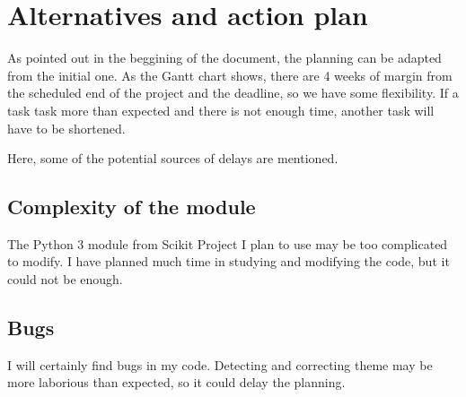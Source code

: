 \documentclass[a4paper]{article}
\begin{document}
    \section{Alternatives and action plan}

    As pointed out in the beggining of the document, the planning can be adapted from the initial one. As the Gantt chart shows, there are 4 weeks of margin from the scheduled end of the project and the deadline, so we have some flexibility. If a task task more than expected and there is not enough time, another task will have to be shortened.

    Here, some of the potential sources of delays are mentioned.

    \subsection{Complexity of the module}

    The Python 3 module from Scikit Project I plan to use may be too complicated to modify. I have planned much time in studying and modifying the code, but it could not be enough.

    \subsection{Bugs}

    I will certainly find bugs in my code. Detecting and correcting theme may be more laborious than expected, so it could delay the planning.










\end{document}

